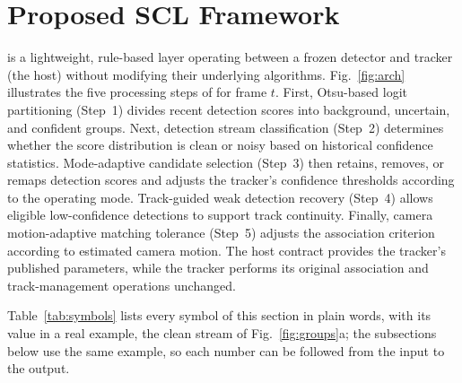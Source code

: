 \section{Proposed SCL Framework}\label{sec:method}

\scl{} is a lightweight, rule-based layer operating between a frozen detector and tracker (the
host) without modifying their underlying algorithms. Fig.~\ref{fig:arch} illustrates the five
processing steps of \scl{} for frame $t$. First, Otsu-based logit partitioning (Step~1) divides
recent detection scores into background, uncertain, and confident groups. Next, detection stream
classification (Step~2) determines whether the score distribution is clean or noisy based on
historical confidence statistics. Mode-adaptive candidate selection (Step~3) then retains,
removes, or remaps detection scores and adjusts the tracker's confidence thresholds according to
the operating mode. Track-guided weak detection recovery (Step~4) allows eligible low-confidence
detections to support track continuity. Finally, camera motion-adaptive matching tolerance
(Step~5) adjusts the association criterion according to estimated camera motion. The host
contract provides the tracker's published parameters, while the tracker performs its original
association and track-management operations unchanged.

Table~\ref{tab:symbols} lists every symbol of this section in plain words, with its value in a
real example, the clean stream of Fig.~\ref{fig:groups}a; the subsections below use the same
example, so each number can be followed from the input to the output.




